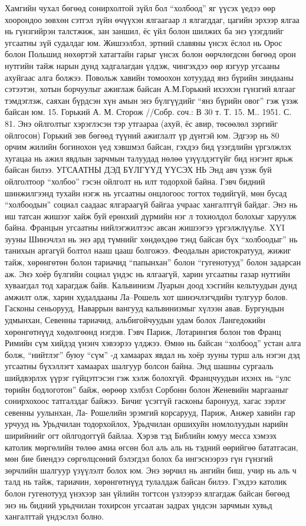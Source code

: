 Хамгийн чухал бөгөөд сонирхолтой зүйл бол “холбоод” яг үүсэх үедээ өөр хоорондоо зөвхөн сэтгэл зүйн өчүүхэн ялгаагаар л ялгагддаг, цагийн эрхээр ялгаа нь гүнзгийрэн талстжиж, зан заншил, ёс үйл болон шилжих ба энэ үзэгдлийг угсаатны зүй судалдаг юм. Жишээлбэл, эртний славяны үнсэх ёслол нь Орос болон Польшид нөхөртэй хатагтайн гарыг үнсэх болон өөрчлөгдсөн бөгөөд орон нутгийн тайж нарын дунд хадгалагдан үлдэж, чингэхдээ өөр язгуур угсааны ахуйгаас алга болжээ.
Повольж хавийн томоохон хотуудад янз бүрийн зиндааны сэтээтэн, хотын борчуулыг ажиглаж байсан А.М.Горький ихээхэн гүнзгий ялгааг тэмдэглэж, саяхан бүрдсэн хүн амын энэ бүлгүүдийг “янз бүрийн овог” гэж үзэж байсан юм. 15. Горький А. М. Сторож //Собр. соч.: В 30 т. Т. 15. М.. 1951. С. 81.
Энэ ойлголтыг хэрэглэсэн тэр утгаараа (ахуй, ёс авир, төсөөлөл зэргийг ойлгосон) Горький зөв бөгөөд түүний ажиглалт үр дүнтэй юм. Эдгээр нь 80 орчим жилийн богинохон үед хэвшмэл байсан, гэхдээ бид үзэгдлийн үргэлжлэх хугацаа нь ажил явдлын зарчмын талуудад нөлөө үзүүлдэггүйг бид нэгэнт ярьж байсан билээ.
УГСААТНЫ ДЭД БҮЛГҮҮД ҮҮСЭХ НЬ
Энд авч үзэж буй ойлголтоор “холбоо” гэсэн ойлголт нь илт тодорхой байна. Гэвч бидний шинжилгээнд тухайн нэгж нь угсаатны онцлогоос тогтох төдийгүй, мөн бусад “холбоодын” социал саадаас ялгараагүй байгаа учраас хангалтгүй байдаг. Энэ нь иш татсан жишээг хайж буй ерөнхий дүрмийн нэг л тохиолдол болохыг харуулж байна.
Францын угсаатны нийлэгжилтээс авсан жишээгээ үргэлжлүүлье. XYI зууны Шинэчлэл нь энэ ард түмнийг хөндөхдөө тэнд байсан бүх “холбоодыг” нь танихын аргагүй болтол нааш цааш болгожээ. Феодалын аристократууд, жижиг тайж, хөрөнгөтөн болон тариачид “папынхан” болон “гугенотууд” болон задарсан аж. Энэ хоёр бүлгийн социал үндэс нь ялгаагүй, харин угсаатны газар нутгийн хуваагдал тод харагдаж байв. Кальвинизм Луарын доод хэсгийн кельтуудын дунд амжилт олж, харин худалдааны Ла–Рошель хот шинэчлэгчдийн тулгуур болов. Гасконы сеньорууд, Наваррын вангууд кальвинизмыг хүлээн авав. Бургундын удмынхан, Севенны тариачид, альбигойчуудын удам болох Лангедокийн хөрөнгөтнүүд хөдөлгөөнд нэгдэв. Гэвч Париж, Лотарингия болон төв Франц Римийн сүм хийдэд үнэнч хэвээрээ үлджээ. Өмнө нь байсан “холбоод” устан алга болж, “нийтлэг” буюу “сүм” -д хамаарах явдал нь хоёр зууны турш аль нэгэн дэд угсаатны бүхэллэгт хамаарах шалгуур болсон байна.
Энд шашны сургааль шийдвэрлэх үүрэг гүйцэтгэсэн гэж хэлж болохгүй. Францчуудын ихэнх нь “улс төрийн бодлоготон” байж, өөрөөр хэлбэл Сорбонн болон Женевийн маргааныг сонирхохоос татгалздаг байжээ. Бичиг үсэггүй гасконы баронууд, хагас зэрлэг севенны уулынхан, Ла- Рошелийн эрэмгий корсарууд, Париж, Анжер хавийн гар урчууд нь Урьдчилан тодорхойлох, Урьдчилан оршихуйн номлолуудын нарийн ширийнийг огт ойлгодоггүй байлаа. Хэрэв тэд Библийн юмуу месса хэмээх католик мөргөлийн төлөө амиа өгсөн бол аль аль нь тэдний өөрийгөө бататгасан, мөн бие биендээ сөргөлцсөний бэлэгдэл болох ба ингэснээрээ гүн гүнзгий зөрчлийн шалгуур үзүүлэлт болох юм. Энэ зөрчил нь ангийн биш, учир нь аль ч талд нь тайж, тариачин, хөрөнгөтнүүд тулалдаж байсан билээ. Гэхдээ католик болон гугенотууд үнэхээр зан үйлийн тогтсон үзлээрээ ялгагдаж байсан бөгөөд энэ нь бидний урьдчилан тохирсон угсаатан задрах үндсэн зарчмын хувьд хангалттай үндэслэл болно.
